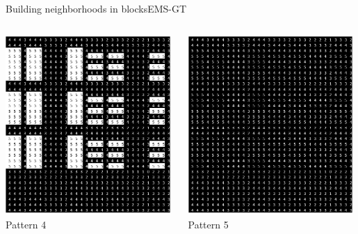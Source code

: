 \documentclass[pdf,xcolor={dvipsnames}]{beamer}
\begin{document}
\begin{frame}{Building neighborhoods in blocks}{EMS-GT}
{\begin{columns}
		\begin{column}{.135\textwidth}\centering\includegraphics[width=0.98\textwidth]{img/4}\\Pattern 4 \end{column}
		\begin{column}{.135\textwidth}\centering\includegraphics[width=0.98\textwidth]{img/5}\\Pattern 5 \end{column}
		\end{columns}\ \\\ \\
		}


\end{frame}
\end{document}
